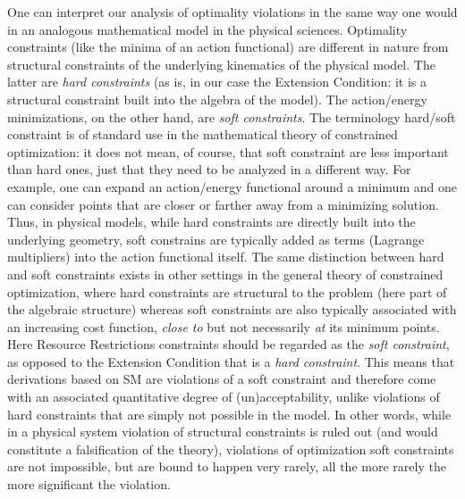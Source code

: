 \documentclass[12pt]{amsart}
\numberwithin{equation}{section}
\begin{document}
One can interpret our analysis of optimality violations in the 
same way one would in an analogous mathematical
model in the physical sciences. Optimality constraints (like the minima
of an action functional) are different in nature from structural
constraints of the underlying kinematics of the physical model. The
latter are {\em hard constraints} (as is, in our case the Extension Condition:
it is a structural constraint built into the algebra of the model). The
action/energy minimizations, on the other hand, are {\em soft constraints}.
The terminology hard/soft constraint is of standard use in the mathematical
theory of constrained optimization: it does not mean, of course, that
soft constraint are less important than hard ones, just that they need
to be analyzed in a different way. For example,
one can expand an action/energy functional around a minimum and one can consider
points that are closer or farther away from a minimizing solution. Thus,
in physical models, while hard constraints are directly built into the
underlying geometry, soft constrains are typically added as terms 
(Lagrange multipliers) into the action functional itself.
The same distinction between hard and soft constraints exists in
other settings in the general theory of constrained optimization, 
where hard constraints are structural to the problem (here part
of the algebraic structure) whereas soft constraints are also 
typically associated with an increasing cost function, {\em close to}
but not necessarily {\em at} its minimum points. Here Resource Restrictions constraints
should be regarded as the {\em soft constraint}, as opposed
to the Extension Condition that is a {\em hard constraint}. This
means that derivations based on SM are violations of a soft
constraint and therefore come with an associated quantitative
degree of (un)acceptability, unlike violations of hard constraints
that are simply not possible in the model. In other words,
while in a physical system violation of structural constraints
is ruled out (and would constitute a falsification of the theory), 
violations of optimization soft constraints are not impossible, 
but are bound to happen very rarely, all the
more rarely the more significant the violation. 

\smallskip
\end{document}

